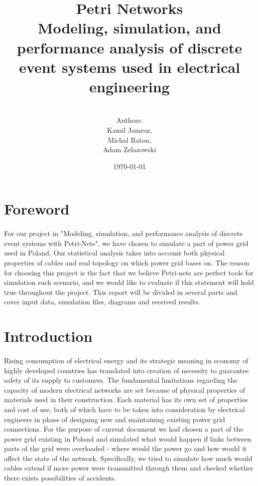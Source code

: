 \documentclass[a4paper]{article}
\title{Petri Networks\\Modeling, simulation, and performance analysis of discrete event systems used in electrical engineering}
\author{\\Authors:\\ Kamil Jamroz,\\ Michal Raton,\\ Adam Zelazowski\\}
\date{\today}
\begin{document}
\maketitle

\clearpage

\tableofcontents

\clearpage

%
\section{Foreword}
\label{cha:foreword}
\paragraph{}
For our project in "Modeling, simulation, and performance analysis of discrete event systems with Petri-Nets", we have chosen to simulate a part of power grid used in Poland. Our statistical analysis takes into account both physical properties of cables and real topology on which power grid bases on. The reason for choosing this project is the fact that we believe Petri-nets are perfect tools for simulation such scenario, and we would like to evaluate if this statement will hold true throughout the project. This report will be divided in several parts and cover input data, simulation files, diagrams and received results.

%
\section{Introduction}  
\label{cha:introduction}
\paragraph{}
Rising consumption of electrical energy and its strategic meaning in economy of highly developed countries has translated into creation of necessity to guarantee safety of its supply to customers. The fundamental limitations regarding the capacity of modern electrical networks are set because of physical properties of materials used in their construction. Each material has its own set of properties and cost of use, both of which have to be taken into consideration by electrical engineers in phase of designing new and maintaining existing power grid connections. For the purpose of current document we had chosen a part of the power grid existing in Poland and simulated what would happen if links between parts of the grid were overloaded - where would the power go and how would it affect the state of the network. Specifically, we tried to simulate how much would cables extend if more power were transmitted through them and checked whether there exists possibilities of accidents.
\end{document}
